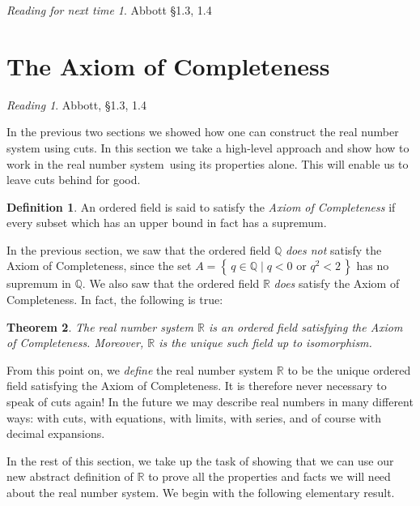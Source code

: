 \documentclass[11pt,oneside]{amsbook}
\newcommand{\set}[1]{\left\{\,#1\,\right\}}
\newcommand{\Q}{\mathbb Q}
\newcommand{\R}{\mathbb R}
\theoremstyle{definition}
\theoremstyle{plain}
\newtheorem{theorem}{Theorem}[section]
\theoremstyle{definition}
\newtheorem{definition}[theorem]{Definition}
\theoremstyle{remark}
\newtheorem*{reading}{Reading}
\newtheorem*{readnext}{Reading for next time}
\numberwithin{equation}{section}
\numberwithin{figure}{section}
\begin{document}
\vspace{\fill}
\begin{readnext}
  Abbott \S 1.3, 1.4
\end{readnext}


\newpage
\section{The Axiom of Completeness}

\begin{reading}
  Abbott, \S 1.3, 1.4
\end{reading}

In the previous two sections we showed how one can construct the real number system using cuts. In this section we take a high-level approach and show how to work in the real number system using its properties alone. This will enable us to leave cuts behind for good.

\begin{definition}
  An ordered field is said to satisfy the \emph{Axiom of Completeness} if every subset which has an upper bound in fact has a supremum.
\end{definition}

In the previous section, we saw that the ordered field $\Q$ \emph{does not} satisfy the Axiom of Completeness, since the set $A=\set{q\in\Q\mid q<0\text{ or }q^2<2}$ has no supremum in $\Q$. We also saw that the ordered field $\R$ \emph{does} satisfy the Axiom of Completeness. In fact, the following is true:

\begin{theorem}
  The real number system $\R$ is an ordered field satisfying the Axiom of Completeness. Moreover, $\R$ is the unique such field up to isomorphism.
\end{theorem}

From this point on, we \emph{define} the real number system $\R$ to be the unique ordered field satisfying the Axiom of Completeness. It is therefore never necessary to speak of cuts again! In the future we may describe real numbers in many different ways: with cuts, with equations, with limits, with series, and of course with decimal expansions.

In the rest of this section, we take up the task of showing that we can use our new abstract definition of $\R$ to prove all the properties and facts we will need about the real number system. We begin with the following elementary result.
\end{document}
